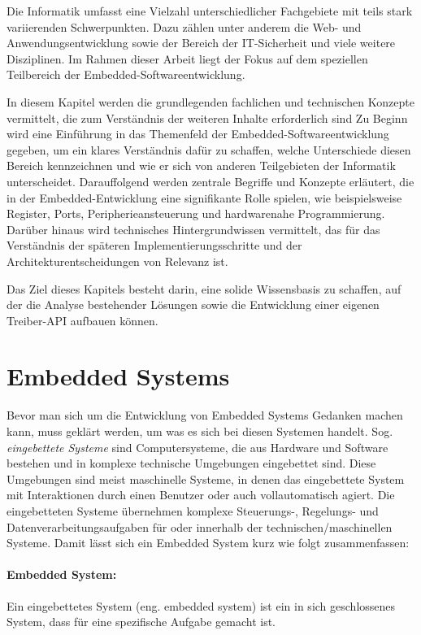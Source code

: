 
Die Informatik umfasst eine Vielzahl unterschiedlicher Fachgebiete mit teils stark variierenden Schwerpunkten. 
Dazu zählen unter anderem die Web- und Anwendungsentwicklung sowie der Bereich der IT-Sicherheit und viele weitere Disziplinen. 
Im Rahmen dieser Arbeit liegt der Fokus auf dem speziellen Teilbereich der Embedded-Softwareentwicklung.

In diesem Kapitel werden die grundlegenden fachlichen und technischen Konzepte vermittelt, die zum Verständnis der weiteren Inhalte erforderlich sind
Zu Beginn wird eine Einführung in das Themenfeld der Embedded-Softwareentwicklung gegeben, um ein klares Verständnis dafür zu schaffen, welche Unterschiede diesen Bereich kennzeichnen und wie er sich von anderen Teilgebieten der Informatik unterscheidet.
Darauffolgend werden zentrale Begriffe und Konzepte erläutert, die in der Embedded-Entwicklung eine signifikante Rolle spielen, wie beispielsweise Register, Ports, Peripherieansteuerung und hardwarenahe Programmierung.
Darüber hinaus wird technisches Hintergrundwissen vermittelt, das für das Verständnis der späteren Implementierungsschritte und der Architekturentscheidungen von Relevanz ist.

Das Ziel dieses Kapitels besteht darin, eine solide Wissensbasis zu schaffen, auf der die Analyse bestehender Lösungen sowie die Entwicklung einer eigenen Treiber-API aufbauen können.
\section{Embedded Systems}
Bevor man sich um die Entwicklung von Embedded Systems Gedanken machen kann, muss geklärt werden, um was es sich bei diesen Systemen handelt.
Sog. \emph{eingebettete Systeme} sind Computersysteme, die aus Hardware und Software bestehen und in komplexe technische Umgebungen eingebettet sind.
Diese Umgebungen sind meist maschinelle Systeme, in denen das eingebettete System mit Interaktionen durch einen Benutzer oder auch vollautomatisch agiert.
Die eingebetteten Systeme übernehmen komplexe Steuerungs-, Regelungs- und Datenverarbeitungsaufgaben für oder innerhalb der technischen/maschinellen Systeme.
Damit lässt sich ein Embedded System kurz wie folgt zusammenfassen:

\paragraph{Embedded System:}
Ein eingebettetes System (eng. embedded system) ist ein in sich geschlossenes System, dass für eine spezifische Aufgabe gemacht ist.

